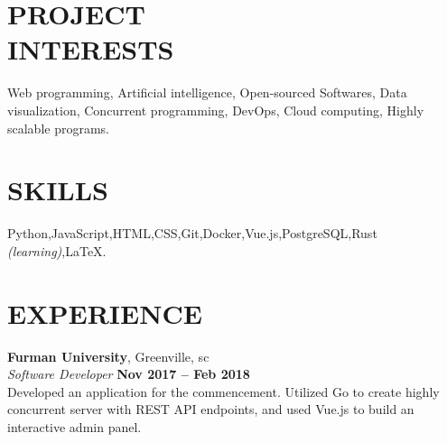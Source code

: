 \documentclass[margin,line]{resume}
\begin{document}
\begin{resume}

\vspace{1mm}

    \section{\mysidestyle \textbf{\large{P}\small{ROJECT\\INTERESTS}}}

    	Web programming, Artificial intelligence, Open-sourced Softwares, Data visualization, Concurrent programming, DevOps, Cloud computing, Highly scalable programs.

\sectionline

    \section{\mysidestyle \textbf{\large{S}\small{KILLS}}}

    Python,\hspace{2mm}JavaScript,\hspace{2mm}HTML,\hspace{2mm}CSS,\hspace{2mm}Git,\hspace{2mm}Docker,\hspace{2mm}Vue.js,\hspace{2mm}PostgreSQL,\hspace{2mm}Rust \textsl{\small(learning)},\hspace{2mm}\LaTeX.


\sectionline

    \section{\mysidestyle \textbf{\large{E}\small{XPERIENCE}}}

    \textbf{\listing Furman University}, Greenville, sc \vspace{2mm}\\\vspace{1mm}%
    \textsl{Software Developer} \hfill \textbf{Nov 2017 -- Feb 2018}\\
    Developed an application for the commencement. Utilized Go to create highly concurrent server with REST API endpoints, and used Vue.js to build an interactive admin panel. \vspace{1mm}


\end{resume}
\end{document}
